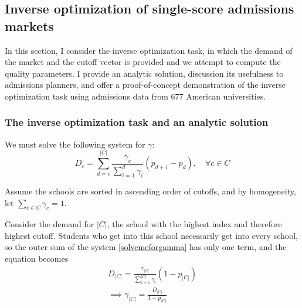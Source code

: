 \documentclass[12pt]{article}
\theoremstyle{definition}
\begin{document}






\subsection{Inverse optimization of single-score admissions markets}
In this section, I consider the inverse optimization task, in which the demand of the market and the cutoff vector is provided and we attempt to compute the quality parameters. I provide an analytic solution, discussion its usefulness to admissions planners, and offer a proof-of-concept demonstration of the inverse optimization task using admissions data from 677 American universities. 

\subsubsection{The inverse optimization task and an analytic solution}
We must solve the following system for $\gamma$:
\begin{equation}
D_c = \sum_{d=c}^{|C|} 
\frac{\gamma_c}{ \sum_{i=1}^d \gamma_i} 
\left(p_{d+1} - p_{d}\right),
\quad \forall c \in C
 \label{solvemeforgamma}
 \end{equation}

Assume the schools are sorted in ascending order of cutoffs, and by homogeneity, let $\sum_{c \in C} \gamma_c = 1$.

Consider the demand for $|C|$, the school with the highest index and therefore highest cutoff. Students who get into this school necessarily get into every school, so the outer sum of the system \eqref{solvemeforgamma} has only one term, and the equation becomes
\begin{align}D_{|C|} =
\frac{\gamma_{|C|}}{ \sum_{i=1}^{|C|} \gamma_i} 
\left(1 - p_{|C|}\right) \\
\implies \gamma_{|C|} = \frac{D_{|C|}}{1 - p_{|C|}}
\end{align}
\end{document}
